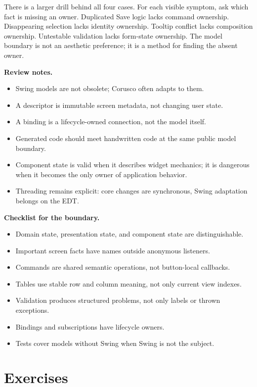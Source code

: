 There is a larger drill behind all four cases. For each visible symptom, ask which fact is missing an owner. Duplicated Save logic lacks command ownership. Disappearing selection lacks identity ownership. Tooltip conflict lacks composition ownership. Untestable validation lacks form-state ownership. The model boundary is not an aesthetic preference; it is a method for finding the absent owner.

\textbf{Review notes.}

\begin{itemize}
\item Swing models are not obsolete; Corusco often adapts to them.
\item A descriptor is immutable screen metadata, not changing user state.
\item A binding is a lifecycle-owned connection, not the model itself.
\item Generated code should meet handwritten code at the same public model boundary.
\item Component state is valid when it describes widget mechanics; it is dangerous when it becomes the only owner of application behavior.
\item Threading remains explicit: core changes are synchronous, Swing adaptation belongs on the EDT.
\end{itemize}

\textbf{Checklist for the boundary.}

\begin{itemize}
\item Domain state, presentation state, and component state are distinguishable.
\item Important screen facts have names outside anonymous listeners.
\item Commands are shared semantic operations, not button-local callbacks.
\item Tables use stable row and column meaning, not only current view indexes.
\item Validation produces structured problems, not only labels or thrown exceptions.
\item Bindings and subscriptions have lifecycle owners.
\item Tests cover models without Swing when Swing is not the subject.
\end{itemize}

\section{Exercises}

